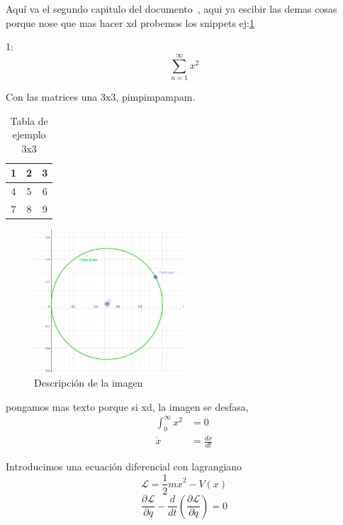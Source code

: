 Aquí va el segundo capitulo del documento~\cite{martin1988estudio}, aqui ya escibir las demas cosas porque nose que mas hacer xd 
probemos los snippets ej:\ref{tab:ejemplo_3x3} 

1:
\begin{equation}
    \sum_{n = 1}^{\infty} x^2 
\end{equation}


Con las matrices una 3x3, pimpimpampam.
\begin{table}[ht]
\centering
\begin{tabular}{|c|c|c|}
\hline
1 & 2 & 3 \\ \hline
4 & 5 & 6 \\ \hline
7 & 8 & 9 \\ \hline
\end{tabular}
\caption{Tabla de ejemplo 3x3}
\label{tab:ejemplo_3x3}
\end{table}

\begin{figure}[H]
\centering
\includegraphics[width=0.5\textwidth]{Imagenes/Captura de pantalla 2024-11-29 113246.png}
\caption{Descripción de la imagen}
\label{fig:ejemplo_imagen}
\end{figure}

pongamos mas texto porque si xd, la imagen se desfasa, 
\begin{align*}
\int_{0}^{\infty} x^2 & = 0\\
\dot{x} & =\frac{dx}{dt} 
\end{align*}

Introducimos una ecuación diferencial con lagrangiano
\begin{equation}
\mathcal{L} = \frac{1}{2} m \dot{x}^2 - V(x)
\end{equation}
\begin{equation}
    \frac{\partial \mathcal{L}}{\partial q} - \frac{d}{dt} \left( \frac{\partial \mathcal{L}}{\partial \dot{q}} \right) = 0
\end{equation}
